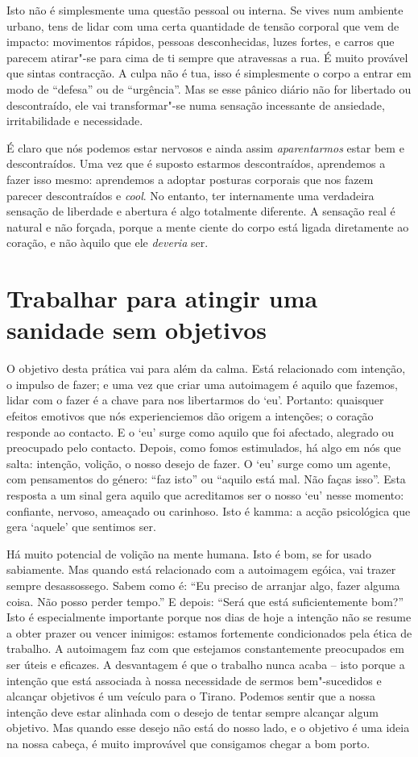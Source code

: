 Isto não é simplesmente uma questão pessoal ou interna. Se vives num
ambiente urbano, tens de lidar com uma certa quantidade de tensão
corporal que vem de impacto: movimentos rápidos, pessoas desconhecidas,
luzes fortes, e carros que parecem atirar"-se para cima de ti sempre que
atravessas a rua. É muito provável que sintas contracção. A culpa não é
tua, isso é simplesmente o corpo a entrar em modo de “defesa” ou de
“urgência”. Mas se esse pânico diário não for libertado ou descontraído,
ele vai transformar"-se numa sensação incessante de ansiedade,
irritabilidade e necessidade.

É claro que nós podemos estar nervosos e ainda assim \emph{aparentarmos}
estar bem e descontraídos. Uma vez que é suposto estarmos descontraídos,
aprendemos a fazer isso mesmo: aprendemos a adoptar posturas corporais
que nos fazem parecer descontraídos e \emph{cool}. No entanto, ter
internamente uma verdadeira sensação de liberdade e abertura é algo
totalmente diferente. A sensação real é natural e não forçada, porque a
mente ciente do corpo está ligada diretamente ao coração, e não àquilo
que ele \emph{deveria} ser.

\section{Trabalhar para atingir uma sanidade sem
objetivos}

O objetivo desta prática vai para além da calma. Está relacionado com
intenção, o impulso de fazer; e uma vez que criar uma autoimagem é
aquilo que fazemos, lidar com o fazer é a chave para nos libertarmos do
`eu'. Portanto: quaisquer efeitos emotivos que nós experienciemos dão
origem a intenções; o coração responde ao contacto. E o `eu' surge como
aquilo que foi afectado, alegrado ou preocupado pelo contacto. Depois,
como fomos estimulados, há algo em nós que salta: intenção, volição, o
nosso desejo de fazer. O `eu' surge como um agente, com pensamentos do
género: “faz isto” ou “aquilo está mal. Não faças isso”. Esta resposta a
um sinal gera aquilo que acreditamos ser o nosso `eu' nesse momento:
confiante, nervoso, ameaçado ou carinhoso. Isto é kamma: a acção
psicológica que gera `aquele' que sentimos ser.

Há muito potencial de volição na mente humana. Isto é bom, se for usado
sabiamente. Mas quando está relacionado com a autoimagem egóica, vai
trazer sempre desassossego. Sabem como é: “Eu preciso de arranjar algo,
fazer alguma coisa. Não posso perder tempo.” E depois: “Será que está
suficientemente bom?” Isto é especialmente importante porque nos dias de
hoje a intenção não se resume a obter prazer ou vencer inimigos: estamos
fortemente condicionados pela ética de trabalho. A autoimagem faz com
que estejamos constantemente preocupados em ser úteis e eficazes. A
desvantagem é que o trabalho nunca acaba -- isto porque a intenção que
está associada à nossa necessidade de sermos bem"-sucedidos e alcançar
objetivos é um veículo para o Tirano. Podemos sentir que a nossa
intenção deve estar alinhada com o desejo de tentar sempre alcançar
algum objetivo. Mas quando esse desejo não está do nosso lado, e o
objetivo é uma ideia na nossa cabeça, é muito improvável que consigamos
chegar a bom porto.

